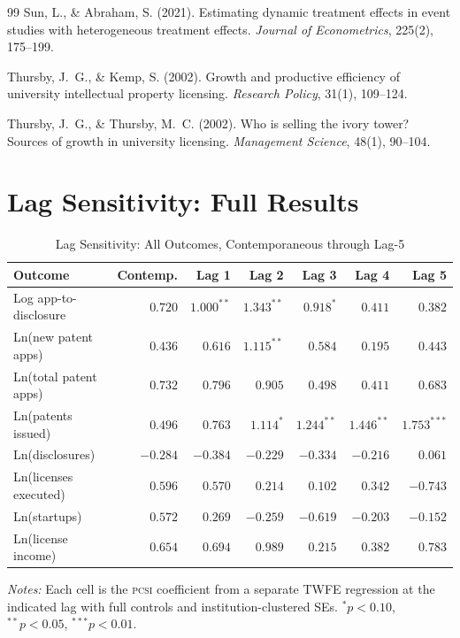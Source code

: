 \documentclass[12pt]{article}
\newcommand{\PCSI}{\textsc{pcsi}}
\begin{document}
\begin{thebibliography}{99}
Sun, L., \& Abraham, S. (2021). Estimating dynamic treatment effects in event studies
with heterogeneous treatment effects. \textit{Journal of Econometrics}, 225(2), 175--199.

Thursby, J.~G., \& Kemp, S. (2002). Growth and productive efficiency of university
intellectual property licensing. \textit{Research Policy}, 31(1), 109--124.

Thursby, J.~G., \& Thursby, M.~C. (2002). Who is selling the ivory tower? Sources of
growth in university licensing. \textit{Management Science}, 48(1), 90--104.

\end{thebibliography}

\appendix

\section{Lag Sensitivity: Full Results}
\label{app:lagsens}

\begin{table}[htbp]
\centering
\caption{Lag Sensitivity: All Outcomes, Contemporaneous through Lag-5}
\label{tab:lagsens}
\begin{threeparttable}
\begin{tabular}{lrrrrrr}
\toprule
Outcome & Contemp. & Lag 1 & Lag 2 & Lag 3 & Lag 4 & Lag 5 \\
\midrule
Log app-to-disclosure & $0.720$ & $1.000^{**}$ & $1.343^{**}$ & $0.918^*$ & $0.411$ & $0.382$ \\
Ln(new patent apps) & $0.436$ & $0.616$ & $1.115^{**}$ & $0.584$ & $0.195$ & $0.443$ \\
Ln(total patent apps) & $0.732$ & $0.796$ & $0.905$ & $0.498$ & $0.411$ & $0.683$ \\
Ln(patents issued) & $0.496$ & $0.763$ & $1.114^*$ & $1.244^{**}$ & $1.446^{**}$ & $1.753^{***}$ \\
Ln(disclosures) & $-0.284$ & $-0.384$ & $-0.229$ & $-0.334$ & $-0.216$ & $0.061$ \\
Ln(licenses executed) & $0.596$ & $0.570$ & $0.214$ & $0.102$ & $0.342$ & $-0.743$ \\
Ln(startups) & $0.572$ & $0.269$ & $-0.259$ & $-0.619$ & $-0.203$ & $-0.152$ \\
Ln(license income) & $0.654$ & $0.694$ & $0.989$ & $0.215$ & $0.382$ & $0.783$ \\
\bottomrule
\end{tabular}
\begin{tablenotes}
\small
\item \textit{Notes:} Each cell is the \PCSI{} coefficient from a separate TWFE regression
at the indicated lag with full controls and institution-clustered SEs.
$^*p<0.10$, $^{**}p<0.05$, $^{***}p<0.01$.
\end{tablenotes}
\end{threeparttable}
\end{table}
\end{document}

